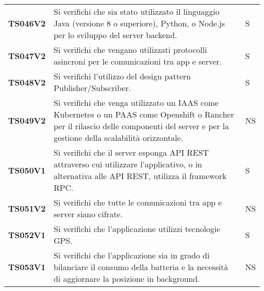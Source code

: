 \documentclass[../../piano-di-qualifica.tex]{subfiles}
\begin{document}
\begin{longtable}[H]{>{\centering\bfseries}m{3cm} >{}m{10cm} >{\centering\arraybackslash}m{3cm}}
  TS046V2            & Si verifichi che sia stato utilizzato il linguaggio Java (versione 8 o superiore), Python, o Node.js per lo sviluppo del server backend.
                     & S               \\

  TS047V2            & Si verifichi che vengano utilizzati protocolli asincroni per le comunicazioni tra app e server.
                     & S                                                                                                                                                                                                                                                               \\

  TS048V2            & Si verifichi l'utilizzo del design pattern Publisher/Subscriber.
                     & S                                                                                                                                                                                                                                                               \\

  TS049V2            & Si verifichi che venga utilizzato un IAAS come Kubernetes o un PAAS come Openshift o Rancher per il rilascio delle componenti del server e per la gestione della scalabilità orizzontale.
                     & NS           
                                                                                                                                                                                                                                                                  \\
  TS050V1            & Si verifichi che il server esponga API REST attraverso cui utilizzare l'applicativo, o in alternativa alle API REST, utilizza il framework RPC\@.
                     & S\\

  TS051V2            & Si verifichi che tutte le comunicazioni tra app e server siano cifrate.
                     & NS\\

  TS052V1            & Si verifichi che l'applicazione utilizzi tecnologie GPS\@.
                     & S \\

  TS053V1            & Si verifichi che l'applicazione sia in grado di bilanciare il consumo della batteria e la necessità di aggiornare la posizione in background.
                     & NS                                                                                                                                                                                                                                                               \\


\end{longtable}
\end{document}
